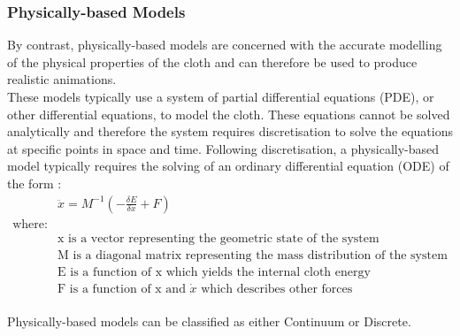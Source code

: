 \subsubsection{Physically-based Models}
By contrast, physically-based models are concerned with the accurate modelling of the physical properties of the cloth and can therefore be used to produce realistic animations.
\\These models typically use a system of partial differential equations (PDE), or other differential equations, to model the cloth. These equations cannot be solved analytically and therefore the system requires discretisation to solve the equations at specific points in space and time. Following discretisation, a physically-based model typically requires the solving of an ordinary differential equation (ODE) of the form \parencite[1]{Baraff1998}:
\begin{equation}
\begin{split}
\label{eq:general ODE}
  &\ddot{x} = M^{-1}(-\frac{\delta E}{\delta x} + F)
  \\\text{where:}
  \\&\text{x is a vector representing the geometric state of the system}
  \\&\text{M is a diagonal matrix representing the mass distribution of the system}
  \\&\text{E is a function of x which yields the internal cloth energy}
  \\&\text{F is a function of x and }\dot{x}\text{ which describes other forces}
  \end{split}
\end{equation}
\\Physically-based models can be classified as either Continuum or Discrete.

